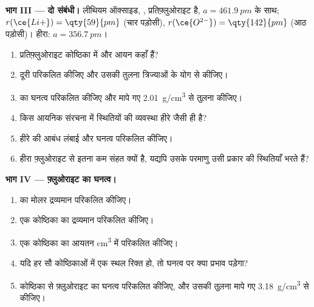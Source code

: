 \begin{problem}
\medskip
\noindent\textbf{भाग III --- दो संबंधी।}
लीथियम ऑक्साइड, , प्रतिफ़्लुओराइट है, $a = \qty{461.9}{pm}$ के साथ;
$r(\ce{Li+}) = \qty{59}{pm}$ (चार पड़ोसी), $r(\ce{O^{2-}}) =
\qty{142}{pm}$ (आठ पड़ोसी)। हीरा: $a = \qty{356.7}{pm}$।
\begin{enumerate}[resume]
  \item प्रतिफ़्लुओराइट कोष्ठिका में  और  आयन
        कहाँ हैं?
  \item {} दूरी परिकलित कीजिए और उसकी तुलना
        त्रिज्याओं के योग से कीजिए।
  \item {} का घनत्व परिकलित कीजिए और मापे गए
        \qty{2.01}{g/cm^3} से तुलना कीजिए।
  \item किस आयनिक संरचना में स्थितियों की व्यवस्था
        हीरे जैसी ही है?
  \item हीरे की  आबंध लंबाई और घनत्व परिकलित कीजिए।
  \item हीरा फ़्लुओराइट से इतना कम संहत क्यों है, यद्यपि उसके
        परमाणु उसी प्रकार की स्थितियाँ भरते हैं?
\end{enumerate}

\medskip
\noindent\textbf{भाग IV --- फ़्लुओराइट का घनत्व।}
\begin{enumerate}[resume]
  \item {} का मोलर द्रव्यमान परिकलित कीजिए।
  \item एक कोष्ठिका का द्रव्यमान परिकलित कीजिए।
  \item एक कोष्ठिका का आयतन \unit{cm^3} में परिकलित कीजिए।
  \item यदि हर सौ कोष्ठिकाओं में एक  स्थल रिक्त हो, तो घनत्व पर
        क्या प्रभाव पड़ेगा?
  \item कोष्ठिका से फ़्लुओराइट का घनत्व परिकलित कीजिए, और उसकी तुलना
        मापे गए \qty{3.18}{g/cm^3} से कीजिए।
\end{enumerate}
\end{problem}
